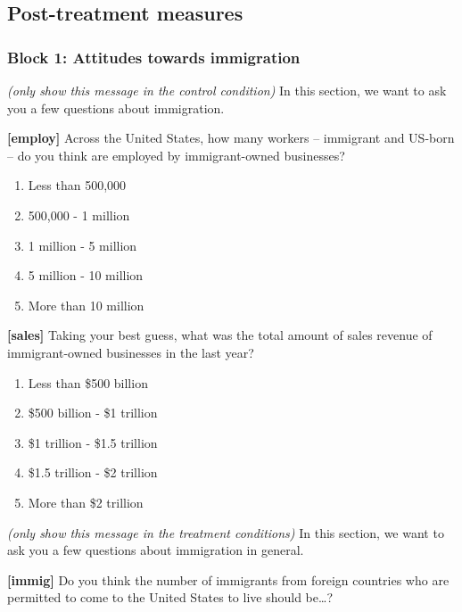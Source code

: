 \documentclass[]{article}
\providecommand{\tightlist}{%
  \setlength{\itemsep}{0pt}\setlength{\parskip}{0pt}}
\begin{document}
\hypertarget{post-treatment-measures}{%
\subsection{Post-treatment measures}\label{post-treatment-measures}}

\hypertarget{block-1-attitudes-towards-immigration}{%
\subsubsection{Block 1: Attitudes towards
immigration}\label{block-1-attitudes-towards-immigration}}

\emph{(only show this message in the control condition)} In this
section, we want to ask you a few questions about immigration.

\textbf{{[}employ{]}} Across the United States, how many workers --
immigrant and US-born -- do you think are employed by immigrant-owned
businesses?

\begin{enumerate}
\def\labelenumi{\arabic{enumi}.}
\tightlist
\item
  Less than 500,000
\item
  500,000 - 1 million
\item
  1 million - 5 million
\item
  5 million - 10 million
\item
  More than 10 million
\end{enumerate}

\textbf{{[}sales{]}} Taking your best guess, what was the total amount
of sales revenue of immigrant-owned businesses in the last year?

\begin{enumerate}
\def\labelenumi{\arabic{enumi}.}
\tightlist
\item
  Less than \$500 billion
\item
  \$500 billion - \$1 trillion
\item
  \$1 trillion - \$1.5 trillion
\item
  \$1.5 trillion - \$2 trillion
\item
  More than \$2 trillion
\end{enumerate}

\emph{(only show this message in the treatment conditions)} In this
section, we want to ask you a few questions about immigration in
general.

\textbf{{[}immig{]}} Do you think the number of immigrants from foreign
countries who are permitted to come to the United States to live should
be\ldots?
\end{document}
